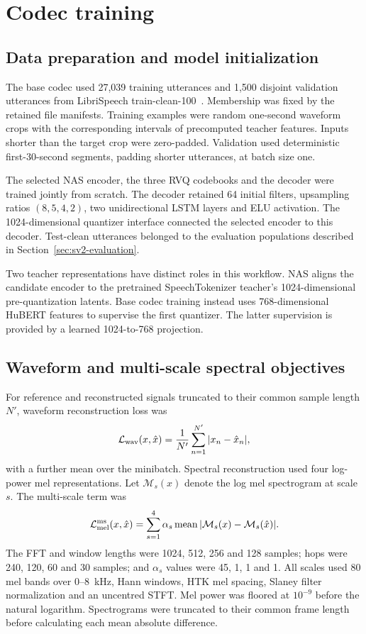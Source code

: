 \section{Codec training}
\label{sec:sv2-training}

\subsection{Data preparation and model initialization}
The base codec used 27,039 training utterances and 1,500 disjoint validation utterances from LibriSpeech train-clean-100~\cite{librispeech}. Membership was fixed by the retained file manifests. Training examples were random one-second waveform crops with the corresponding intervals of precomputed teacher features. Inputs shorter than the target crop were zero-padded. Validation used deterministic first-30-second segments, padding shorter utterances, at batch size one.

The selected NAS encoder, the three RVQ codebooks and the decoder were trained jointly from scratch. The decoder retained 64 initial filters, upsampling ratios $(8,5,4,2)$, two unidirectional LSTM layers and ELU activation. The 1024-dimensional quantizer interface connected the selected encoder to this decoder. Test-clean utterances belonged to the evaluation populations described in Section~\ref{sec:sv2-evaluation}.

Two teacher representations have distinct roles in this workflow. NAS aligns the candidate encoder to the pretrained SpeechTokenizer teacher's 1024-dimensional pre-quantization latents. Base codec training instead uses 768-dimensional HuBERT features to supervise the first quantizer. The latter supervision is provided by a learned 1024-to-768 projection.

\subsection{Waveform and multi-scale spectral objectives}
For reference and reconstructed signals truncated to their common sample length $N'$, waveform reconstruction loss was
\begin{equation}
 \mathcal L_{\rm wav}(x,\hat x)
 =\frac{1}{N'}\sum_{n=1}^{N'}|x_n-\hat x_n|,
 \label{eq:sv2-wav}
\end{equation}
with a further mean over the minibatch. Spectral reconstruction used four log-power mel representations. Let $\mathcal M_s(x)$ denote the log mel spectrogram at scale $s$. The multi-scale term was
\begin{equation}
 \mathcal L_{\rm mel}^{\rm ms}(x,\hat x)
 =\sum_{s=1}^{4}\alpha_s
     \operatorname{mean}|\mathcal M_s(x)-\mathcal M_s(\hat x)|.
 \label{eq:sv2-msmel}
\end{equation}
The FFT and window lengths were 1024, 512, 256 and 128 samples; hops were 240, 120, 60 and 30 samples; and $\alpha_s$ values were 45, 1, 1 and 1. All scales used 80 mel bands over 0--8~kHz, Hann windows, HTK mel spacing, Slaney filter normalization and an uncentred STFT. Mel power was floored at $10^{-9}$ before the natural logarithm. Spectrograms were truncated to their common frame length before calculating each mean absolute difference.

